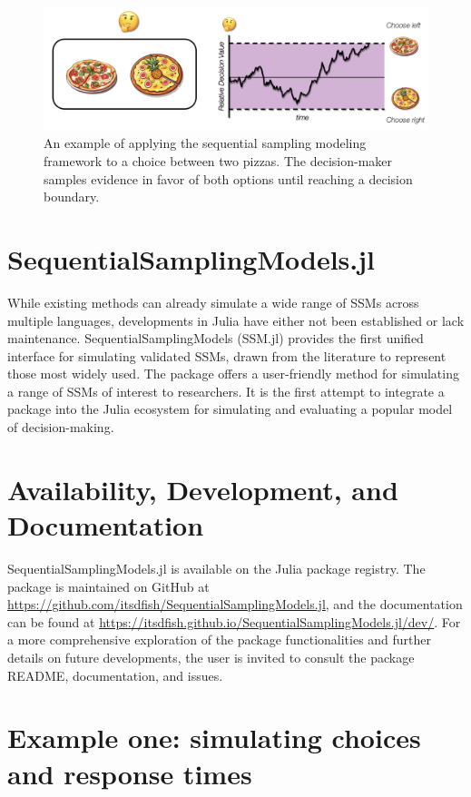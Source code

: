 \documentclass{juliacon}
\begin{document}
\begin{figure}
    \centering
    \includegraphics[width=1\linewidth]{paper//figures/SSM_example_fig1.png}
    \caption{An example of applying the sequential sampling modeling framework to a choice between two pizzas. The decision-maker samples evidence in favor of both options until reaching a decision boundary.}
    \label{fig:exampleSSM}
\end{figure}

\section{SequentialSamplingModels.jl}

While existing methods can already simulate a wide range of SSMs across multiple languages, developments in Julia have either not been established or lack maintenance. SequentialSamplingModels (SSM.jl) provides the first unified interface for simulating validated SSMs, drawn from the literature to represent those most widely used. The package offers a user-friendly method for simulating a range of SSMs of interest to researchers. It is the first attempt to integrate a package into the Julia ecosystem for simulating and evaluating a popular model of decision-making.

\section{Availability, Development, and Documentation}

SequentialSamplingModels.jl is available on the Julia package registry. The package is maintained on GitHub at \url{https://github.com/itsdfish/SequentialSamplingModels.jl}, and the documentation can be found at \url{https://itsdfish.github.io/SequentialSamplingModels.jl/dev/}. For a more comprehensive exploration of the package functionalities and further details on future developments, the user is invited to consult the package README, documentation, and issues.

\section{Example one: simulating choices and response times}
\end{document}
